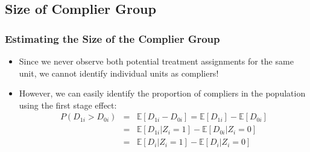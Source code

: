 \documentclass[xcolor=dvipsnames]{beamer}
\newcommand\E{\mathbb{E}}
\begin{document}

\subsection{Size of Complier Group}

\begin{frame}
  \frametitle{Estimating the Size of the Complier Group}
\begin{itemize}
 \item Since we never observe both potential treatment assignments for the same unit, we cannot identify individual units as compliers!
 \medskip
 \item However, we can easily identify the proportion of compliers in the population using the first stage effect:
 \begin{eqnarray*}
   P(D_{1i}>D_{0i}) &=& \E[D_{1i}-D_{0i}] = \E[D_{1i}]-\E[D_{0i}] \\
    &=& \E[D_{1i}|Z_i=1]-\E[D_{0i}|Z_{i}=0] \\
    &=& \E[D_{i}|Z_i=1]-\E[D_{i}|Z_{i}=0]
 \end{eqnarray*}
\end{itemize}
\end{frame}


\end{document}
